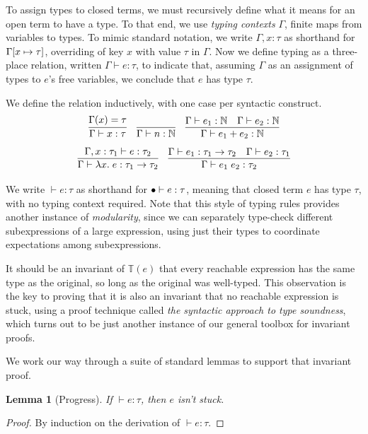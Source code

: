 \documentclass{amsbook}
\newtheorem{lemma}[theorem]{Lemma}
\theoremstyle{definition}
\theoremstyle{remark}
\numberwithin{section}{chapter}
\numberwithin{equation}{chapter}
\begin{document}
\newcommand{\hasty}[3]{#1 \vdash #2 : #3}

To assign types to closed terms, we must recursively define what it means for an open term to have a type.
To that end, we use \emph{typing contexts} $\Gamma$, finite maps from variables to types.
To mimic standard notation, we write $\Gamma, x : \tau$ as shorthand for $\Gamma[x \mapsto \tau]$, overriding of key $x$ with value $\tau$ in $\Gamma$.
Now we define typing as a three-place relation, written $\hasty{\Gamma}{e}{\tau}$, to indicate that, assuming $\Gamma$ as an assignment of types to $e$'s free variables, we conclude that $e$ has type $\tau$.

We define the relation inductively, with one case per syntactic construct.
\modularity
$$\infer{\hasty{\Gamma}{x}{\tau}}{
  \msel{\Gamma}{x} = \tau
}
\quad \infer{\hasty{\Gamma}{n}{\mathbb N}}{}
\quad \infer{\hasty{\Gamma}{e_1 + e_2}{\mathbb N}}{
    \hasty{\Gamma}{e_1}{\mathbb N}
    & \hasty{\Gamma}{e_2}{\mathbb N}
}$$
$$\infer{\hasty{\Gamma}{\lambda x. \; e}{\tau_1 \to \tau_2}}{
  \hasty{\Gamma, x : \tau_1}{e}{\tau_2}
}
\quad \infer{\hasty{\Gamma}{e_1 \; e_2}{\tau_2}}{
  \hasty{\Gamma}{e_1}{\tau_1 \to \tau_2}
  & \hasty{\Gamma}{e_2}{\tau_1}
}$$

We write $\hasty{}{e}{\tau}$ as shorthand for $\hasty{\mempty}{e}{\tau}$, meaning that closed term $e$ has type $\tau$, with no typing context required.
Note that this style of typing rules provides another instance of \emph{modularity}, since we can separately type-check different subexpressions of a large expression, using just their types to coordinate expectations among subexpressions.

It should be an invariant of $\mathbb T(e)$ that every reachable expression has the same type as the original, so long as the original was well-typed.
This observation is the key to proving that it is also an invariant that no reachable expression is stuck, using a proof technique called \emph{the syntactic approach to type soundness}, which turns out to be just another instance of our general toolbox for invariant proofs.

We work our way through a suite of standard lemmas to support that invariant proof.

\begin{lemma}[Progress]\label{progress}
  If $\hasty{}{e}{\tau}$, then $e$ isn't stuck.
\end{lemma}
\begin{proof}
  By induction on the derivation of $\hasty{}{e}{\tau}$.
\end{proof}
\end{document}
